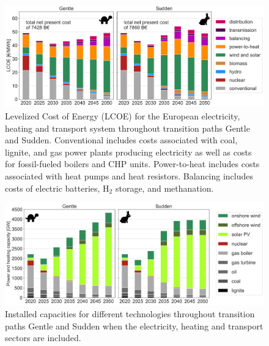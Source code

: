 \documentclass[3p]{elsarticle} %
\begin{document}
\begin{figure}[!h]
	\centering
	\includegraphics[width=\columnwidth]{figures/LCOE_w_EV_exp.png}
	\caption{Levelized Cost of Energy (LCOE) for the European electricity, heating and transport system throughout transition paths Gentle and Sudden. Conventional includes costs associated with coal, lignite, and gas power plants producing electricity as well as costs for fossil-fueled boilers and CHP units. Power-to-heat includes costs associated with heat pumps and heat resistors. Balancing includes costs of electric batteries, H$_2$ storage, and methanation.} 
\end{figure}

\begin{figure}[!h]
	\centering
	\includegraphics[width=\columnwidth]{figures/installed_capacity_w_EV_exp.png}
	\caption{Installed capacities for different technologies throughout transition paths Gentle and Sudden when the electricity, heating and transport sectors are included. } 
\end{figure}

\FloatBarrier


\end{document}
